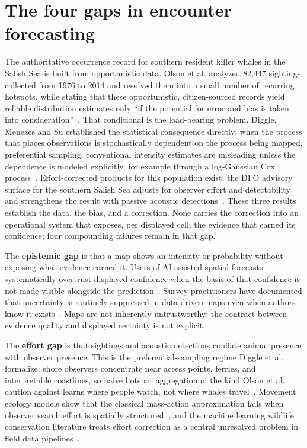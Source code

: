 \section{The four gaps in encounter forecasting}

The authoritative occurrence record for southern resident killer whales in the Salish Sea is built from opportunistic data. Olson et al. analyzed 82{,}447 sightings collected from 1976 to 2014 and resolved them into a small number of recurring hotspots, while stating that these opportunistic, citizen-sourced records yield reliable distribution estimates only ``if the potential for error and bias is taken into consideration''~\cite{olson2018}. That conditional is the load-bearing problem. Diggle, Menezes and Su established the statistical consequence directly: when the process that places observations is stochastically dependent on the process being mapped, preferential sampling, conventional intensity estimates are misleading unless the dependence is modeled explicitly, for example through a log-Gaussian Cox process~\cite{diggle2010}. Effort-corrected products for this population exist; the DFO advisory surface for the southern Salish Sea adjusts for observer effort and detectability and strengthens the result with passive acoustic detections~\cite{thornton2022}. These three results establish the data, the bias, and a correction. None carries the correction into an operational system that exposes, per displayed cell, the evidence that earned its confidence; four compounding failures remain in that gap.

The \textbf{epistemic gap} is that a map shows an intensity or probability without exposing what evidence earned it. Users of AI-assisted spatial forecasts systematically overtrust displayed confidence when the basis of that confidence is not made visible alongside the prediction~\cite{arxiv200102114}. Survey practitioners have documented that uncertainty is routinely suppressed in data-driven maps even when authors know it exists~\cite{arxiv190801697}. Maps are not inherently untrustworthy; the contract between evidence quality and displayed certainty is not explicit.

The \textbf{effort gap} is that sightings and acoustic detections conflate animal presence with observer presence. This is the preferential-sampling regime Diggle et al. formalize: shore observers concentrate near access points, ferries, and interpretable coastlines, so naive hotspot aggregation of the kind Olson et al. caution against learns where people watch, not where whales travel~\cite{diggle2010,olson2018}. Movement ecology models show that the classical mass-action approximation fails when observer search effort is spatially structured~\cite{arxiv190705902}, and the machine learning wildlife conservation literature treats effort correction as a central unresolved problem in field data pipelines~\cite{arxiv211012951}.

